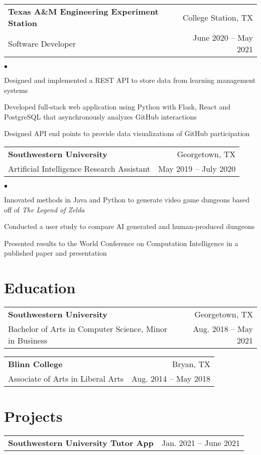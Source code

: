 \documentclass[margin, 11pt]{res}
\makeatletter
\newcommand{\resumeSubheading}[4]{

\begin{tabular*}{1.01\textwidth}{@{\hspace{-4pt}}l @{\extracolsep{\fill}} r}
\textbf{#1} & #2 \\
      {#3} &  {#4}
\end{tabular*}\vspace{-2pt}
}
\newcommand{\resumeSubSubheading}[2]{
\begin{tabular*}{1.01\textwidth}{@{\hspace{-4pt}}l @{\extracolsep{\fill}} r}
    #1 & #2 
\end{tabular*}\vspace{-7pt}
}
\newenvironment{list2}{
	\begin{list}{$\bullet$}{%
	    \small
		\setlength{\itemsep}{0in}
		\setlength{\parsep}{0in} \setlength{\parskip}{0in}
		\setlength{\topsep}{0in} \setlength{\partopsep}{0in}
		\setlength{\leftmargin}{0.2in}}}{\end{list}}
\makeatother
\begin{document}
\begin{resume}
\resumeSubheading{{\bf Texas A\&M Engineering Experiment Station}}{College Station, TX}
                 {Software Developer}{June 2020 -- May 2021}

\begin{list2}
\item{Designed and implemented a REST API to store data from learning management systems }
\item{Developed full-stack web application using Python with Flask, React and PostgreSQL that asynchronously analyzes GitHub interactions }
\item{Designed API end points to provide data visualizations of GitHub participation }
\end{list2}

\resumeSubheading{Southwestern University}{Georgetown, TX}
             {Artificial Intelligence Research Assistant}{May 2019 -- July 2020}

\begin{list2}
\item{Innovated methods in Java and Python to generate video game dungeons based off of \emph{The Legend of Zelda}}
\item{Conducted a user study to compare AI generated and human-produced dungeons}
\item{Presented results to the World Conference on Computation Intelligence in a published paper and presentation}
\end{list2}

\section{\sc Education}

\vspace{2pt}

\resumeSubheading{Southwestern University}{Georgetown, TX}
             {Bachelor of Arts in Computer Science, Minor in Business}{Aug. 2018 -- May 2021}

\resumeSubheading{Blinn College}{Bryan, TX}
             {Associate of Arts in Liberal Arts}{Aug. 2014 -- May 2018}

\section{\sc Projects}

\resumeSubSubheading{\textbf{Southwestern University Tutor App}}{Jan. 2021 -- June 2021}


\end{resume}
\end{document}
